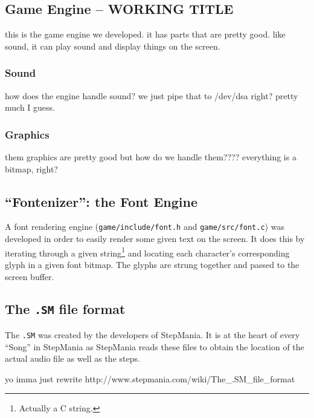 \subsection{Game Engine -- WORKING TITLE}
	this is the game engine we developed. it has parts that are pretty good. like sound, it can play sound and display things on the screen.
	\subsubsection{Sound}
		how does the engine handle sound?
		we just pipe that to /dev/dsa right?
		pretty much I guess.
	\subsubsection{Graphics}
		them graphics are pretty good but how do we handle them????
		everything is a bitmap, right?
\subsection{``Fontenizer'': the Font Engine}
	A font rendering engine (\texttt{game/include/font.h} and \texttt{game/src/font.c}) was developed in order to easily render some given text on the screen.
	It does this by iterating through a given string\footnote{Actually a C string.} and locating each character's corresponding glyph in a given font bitmap.
	The glyphs are strung together and passed to the screen buffer.

\subsection{The \texttt{.SM} file format}
	The \texttt{.SM} was created by the developers of StepMania. It is at the heart of every ``Song'' in StepMania as StepMania reads these files to obtain the location of the actual audio file as well as the steps.
	
	yo imma just rewrite http://www.stepmania.com/wiki/The_.SM_file_format
